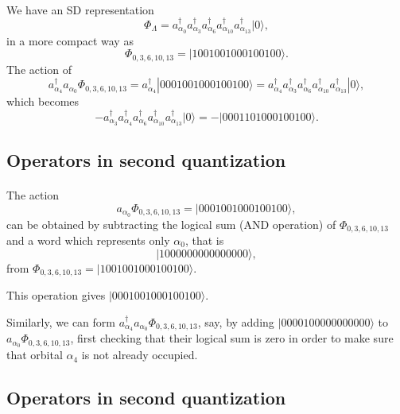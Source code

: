 \documentclass[%
twoside,                 %
final,                   %
10pt]{article}
\begin{document}
\paragraph{}
We have an SD representation
\[
\Phi_{\Lambda} = a_{\alpha_0}^{\dagger} a_{\alpha_3}^{\dagger} a_{\alpha_6}^{\dagger} a_{\alpha_{10}}^{\dagger} a_{\alpha_{13}}^{\dagger} |0\rangle,
\]
in a more compact way as
\[
\Phi_{0,3,6,10,13} = |1001001000100100\rangle.
\]
The action of
\[
a^{\dagger}_{\alpha_4}a_{\alpha_0}\Phi_{0,3,6,10,13} = a^{\dagger}_{\alpha_4}|0001001000100100\rangle=a^{\dagger}_{\alpha_4}a_{\alpha_3}^{\dagger} a_{\alpha_6}^{\dagger} a_{\alpha_{10}}^{\dagger} a_{\alpha_{13}}^{\dagger} |0\rangle,
\]
which becomes
\[
-a_{\alpha_3}^{\dagger} a^{\dagger}_{\alpha_4} a_{\alpha_6}^{\dagger} a_{\alpha_{10}}^{\dagger} a_{\alpha_{13}}^{\dagger} |0\rangle=-|0001101000100100\rangle.
\]






\subsection{Operators in second quantization}

\paragraph{}
The action
\[
a_{\alpha_0}\Phi_{0,3,6,10,13} = |0001001000100100\rangle,
\]
can be obtained by subtracting the logical sum (AND operation) of $\Phi_{0,3,6,10,13}$ and 
a word which represents only $\alpha_0$, that is
\[
|1000000000000000\rangle,
\] 
from $\Phi_{0,3,6,10,13}= |1001001000100100\rangle$.

This operation gives $|0001001000100100\rangle$. 

Similarly, we can form $a^{\dagger}_{\alpha_4}a_{\alpha_0}\Phi_{0,3,6,10,13}$, say, by adding 
$|0000100000000000\rangle$ to $a_{\alpha_0}\Phi_{0,3,6,10,13}$, first checking that their logical sum
is zero in order to make sure that orbital $\alpha_4$ is not already occupied.






\subsection{Operators in second quantization}
\end{document}
